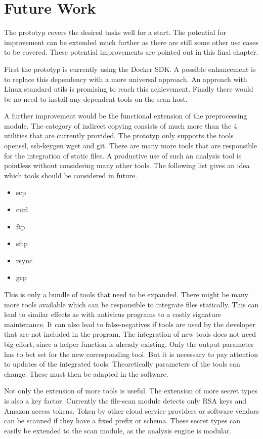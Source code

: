 \chapter{Future Work}
\label{ch:end:future}
The prototyp covers the desired tasks well for a start.
The potential for improvement can be extended much further as there are still some other use cases to be covered.
These potential improvements are pointed out in this final chapter.

First the prototyp is currently using the Docker SDK. 
A possible enhancement is to replace this dependency with a more universal approach. 
An approach with Linux standard utils is promising to reach this achievement.
Finally there would be no need to install any dependent tools on the scan host.


A further improvement would be the functional extension of the preprocessing module.
The category of indirect copying consists of much more than the 4 utilities that are currently provided.
The prototyp only supports the tools openssl, ssh-keygen wget and git.
There are many more tools that are responsible for the integration of static files. 
A productive use of such an analysis tool is pointless without considering many other tools.
The following list gives an idea which tools should be considered in future.
\begin{itemize}
\item scp
\item curl
\item ftp
\item sftp
\item rsync
\item gcp
\end{itemize}
This is only a bundle of tools that need to be expanded.
There might be many more tools available which can be responsible to integrate files statically.
This can lead to similar effects as with antivirus programs to a costly signature maintenance.
It can also lead to false-negatives if tools are used by the developer that are not included in the program.
The integration of new tools does not need big effort, since a helper function is already existing.
Only the output parameter has to bet set for the new corresponding tool.
But it is necessary to pay attention to updates of the integrated tools.
Theoretically parameters of the tools can change. 
These must then be adapted in the software.

Not only the extension of more tools is useful. The extension of more secret types is also a key factor.
Currently the file-scan module detects only RSA keys and Amazon access tokens.
Token by other cloud service providers or software vendors can be scanned if they have a fixed prefix or schema.
These secret types can easily be extended to the scan module, as the analysis engine is modular.


